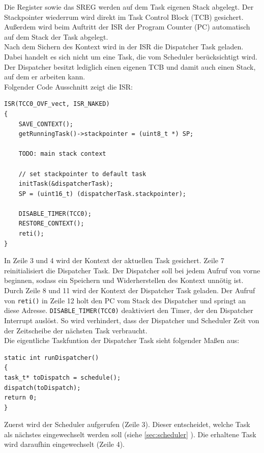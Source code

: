 \documentclass[fontsize=12pt, toc=bibliography, notitlepage]{scrreprt}
\newcommand{\refnn}[1]{\ref{#1} \nameref{#1}}
\begin{document}
Die Register sowie das SREG werden auf dem Task eigenen Stack abgelegt. Der Stackpointer wiederrum wird direkt im Task Control Block (TCB) gesichert. Außerdem wird beim Auftritt der ISR der Program Counter (PC) automatisch auf dem Stack der Task abgelegt.\\

Nach dem Sichern des Kontext wird in der ISR die Dispatcher Task geladen. Dabei handelt es sich nicht um eine Task, die vom Scheduler berücksichtigt wird. Der Dispatcher besitzt lediglich einen eigenen TCB und damit auch einen Stack, auf dem er arbeiten kann.\\

Folgender Code Ausschnitt zeigt die ISR:

\begin{lstlisting}[title=dispatcher.c]
ISR(TCC0_OVF_vect, ISR_NAKED)
{
	SAVE_CONTEXT();
	getRunningTask()->stackpointer = (uint8_t *) SP;
	
	TODO: main stack context
	
	// set stackpointer to default task
	initTask(&dispatcherTask);
	SP = (uint16_t) (dispatcherTask.stackpointer);
	
	DISABLE_TIMER(TCC0);
	RESTORE_CONTEXT();
	reti();
}
\end{lstlisting}

In Zeile 3 und 4 wird der Kontext der aktuellen Task gesichert. Zeile 7 reinitialisiert die Dispatcher Task. Der Dispatcher soll bei jedem Aufruf von vorne beginnen, sodass ein Speichern und Widerherstellen des Kontext unnötig ist. Durch Zeile  8 und 11 wird der Kontext der Dispatcher Task geladen. Der Aufruf von \lstinline$reti()$ in Zeile 12 holt den PC vom Stack des Dispatcher und springt an diese Adresse. \lstinline$DISABLE_TIMER(TCC0)$ deaktiviert den Timer, der den Dispatcher Interrupt auslöst. So wird verhindert, dass der Dispatcher und Scheduler Zeit von der Zeitscheibe der nächsten Task verbraucht.\\

Die eigentliche Taskfuntion der Dispatcher Task sieht folgender Maßen aus:

\begin{lstlisting}[title=dispatcher.c]
static int runDispatcher()
{
task_t* toDispatch = schedule();
dispatch(toDispatch);
return 0;
}
\end{lstlisting}

Zuerst wird der Scheduler aufgerufen (Zeile 3). Dieser entscheidet, welche Task als nächstes eingewechselt werden soll (siehe \refnn{sec:scheduler}). Die erhaltene Task wird daraufhin eingewechselt (Zeile 4).\\
\end{document}
